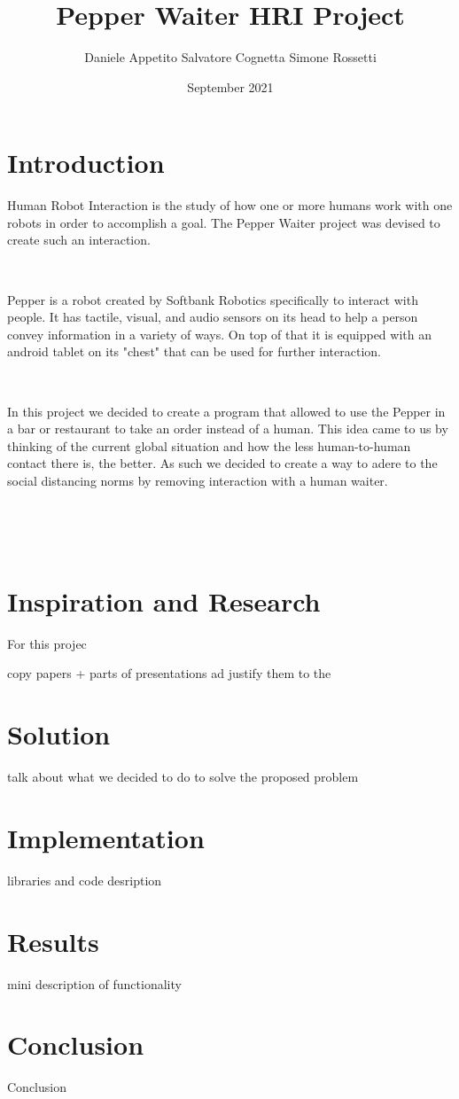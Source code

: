 \documentclass[12pt, letterpaper, twoside]{article}
\title{Pepper Waiter HRI Project}
\author{Daniele Appetito Salvatore Cognetta Simone Rossetti}
\date{September 2021}
\begin{document}
\begin{titlepage}
\maketitle
\end{titlepage}

\tableofcontents
    
\newpage
\section{Introduction}

Human Robot Interaction is the study of how one or more humans work with one robots in order to accomplish a goal. The Pepper Waiter project was devised to create such an interaction. 

\

Pepper is a robot created by Softbank Robotics specifically to interact with people. It has tactile, visual, and audio sensors on its head to help a person convey  information in a variety of ways. On top of that it is equipped with an android tablet on its "chest" that can be used for further interaction. 

\

In this project we decided to create a program that allowed to use the Pepper in a bar or restaurant to take an order instead of a human. This idea came to us by thinking of the current global situation and how the less human-to-human contact there is, the better. As such we decided to create a way to adere to the social distancing norms by removing interaction with a human waiter. 

\


\




\section{Inspiration and Research}

For this projec

copy papers + parts of presentations ad justify them to the 

\section{Solution}

talk about what we decided to do to solve the proposed problem

\section{Implementation}

libraries and code desription

\section{Results}

mini description of functionality

\section{Conclusion}

Conclusion
\end{document}
